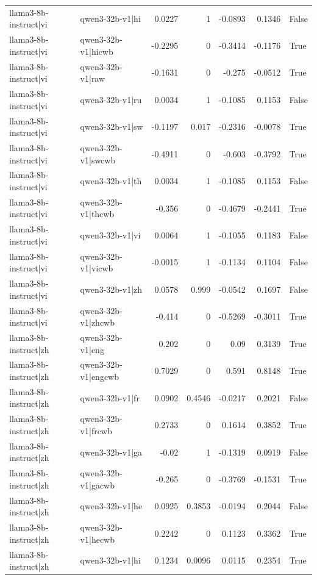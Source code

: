 \begin{table}
\begin{tabular}{l l r r r r l}
llama3-8b-instruct|vi & qwen3-32b-v1|hi & 0.0227 & 1 & -0.0893 & 0.1346 & False \\
llama3-8b-instruct|vi & qwen3-32b-v1|hicwb & -0.2295 & 0 & -0.3414 & -0.1176 & True \\
llama3-8b-instruct|vi & qwen3-32b-v1|raw & -0.1631 & 0 & -0.275 & -0.0512 & True \\
llama3-8b-instruct|vi & qwen3-32b-v1|ru & 0.0034 & 1 & -0.1085 & 0.1153 & False \\
llama3-8b-instruct|vi & qwen3-32b-v1|sw & -0.1197 & 0.017 & -0.2316 & -0.0078 & True \\
llama3-8b-instruct|vi & qwen3-32b-v1|swcwb & -0.4911 & 0 & -0.603 & -0.3792 & True \\
llama3-8b-instruct|vi & qwen3-32b-v1|th & 0.0034 & 1 & -0.1085 & 0.1153 & False \\
llama3-8b-instruct|vi & qwen3-32b-v1|thcwb & -0.356 & 0 & -0.4679 & -0.2441 & True \\
llama3-8b-instruct|vi & qwen3-32b-v1|vi & 0.0064 & 1 & -0.1055 & 0.1183 & False \\
llama3-8b-instruct|vi & qwen3-32b-v1|vicwb & -0.0015 & 1 & -0.1134 & 0.1104 & False \\
llama3-8b-instruct|vi & qwen3-32b-v1|zh & 0.0578 & 0.999 & -0.0542 & 0.1697 & False \\
llama3-8b-instruct|vi & qwen3-32b-v1|zhcwb & -0.414 & 0 & -0.5269 & -0.3011 & True \\
llama3-8b-instruct|zh & qwen3-32b-v1|eng & 0.202 & 0 & 0.09 & 0.3139 & True \\
llama3-8b-instruct|zh & qwen3-32b-v1|engcwb & 0.7029 & 0 & 0.591 & 0.8148 & True \\
llama3-8b-instruct|zh & qwen3-32b-v1|fr & 0.0902 & 0.4546 & -0.0217 & 0.2021 & False \\
llama3-8b-instruct|zh & qwen3-32b-v1|frcwb & 0.2733 & 0 & 0.1614 & 0.3852 & True \\
llama3-8b-instruct|zh & qwen3-32b-v1|ga & -0.02 & 1 & -0.1319 & 0.0919 & False \\
llama3-8b-instruct|zh & qwen3-32b-v1|gacwb & -0.265 & 0 & -0.3769 & -0.1531 & True \\
llama3-8b-instruct|zh & qwen3-32b-v1|he & 0.0925 & 0.3853 & -0.0194 & 0.2044 & False \\
llama3-8b-instruct|zh & qwen3-32b-v1|hecwb & 0.2242 & 0 & 0.1123 & 0.3362 & True \\
llama3-8b-instruct|zh & qwen3-32b-v1|hi & 0.1234 & 0.0096 & 0.0115 & 0.2354 & True \\

\end{tabular}
\end{table}
